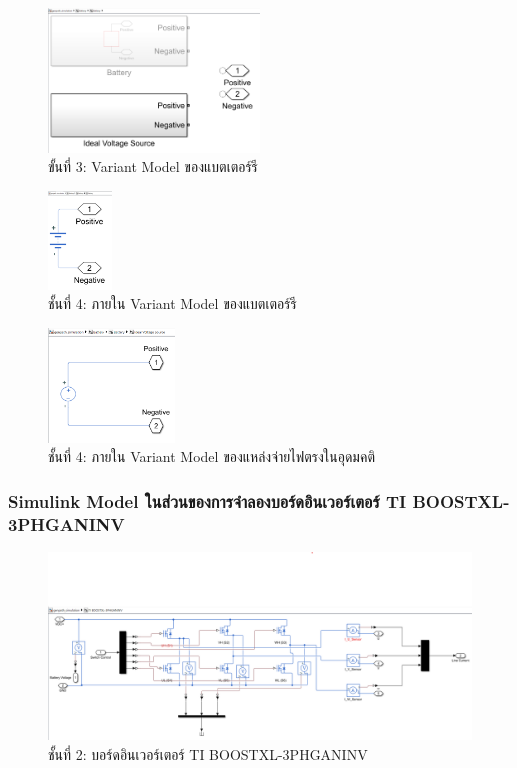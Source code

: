 \documentclass[11pt,a4paper]{article}
\begin{document}
\begin{figure}[H]
    \centering
    \includegraphics[width=0.5\textwidth]{layer2-1.png}
    \caption{ขั้นที่ 3: Variant Model ของแบตเตอร์รี}
\end{figure}

\begin{figure}[H]
    \centering
    \includegraphics[width=0.15\textwidth]{layer2-1-layer0-1.png}
    \caption{ชั้นที่ 4: ภายใน Variant Model ของแบตเตอร์รี}
\end{figure}

\begin{figure}[H]
    \centering
    \includegraphics[width=0.3\textwidth]{layer2-1-layer0-2.png}
    \caption{ชั้นที่ 4: ภายใน Variant Model ของแหล่งจ่ายไฟตรงในอุดมคติ}
\end{figure}

\subsubsection{Simulink Model ในส่วนของการจำลองบอร์ดอินเวอร์เตอร์ TI BOOSTXL-3PHGANINV}

\begin{figure}[H]
    \centering
    \includegraphics[width=\textwidth]{l1-inverter.png}
    \caption{ชั้นที่ 2: บอร์ดอินเวอร์เตอร์ TI BOOSTXL-3PHGANINV}
\end{figure}
\end{document}
